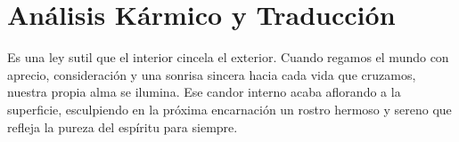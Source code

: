 \section{Análisis Kármico y Traducción}
\begin{figure}
  \vspace{-1.5em}
  \begin{center}
  \end{center}
  \vspace{-1.5em}
\end{figure}
Es una ley sutil que el interior cincela el exterior. Cuando regamos el mundo con aprecio, consideración y una sonrisa sincera hacia cada vida que cruzamos, nuestra propia alma se ilumina. Ese candor interno acaba aflorando a la superficie, esculpiendo en la próxima encarnación un rostro hermoso y sereno que refleja la pureza del espíritu para siempre.

